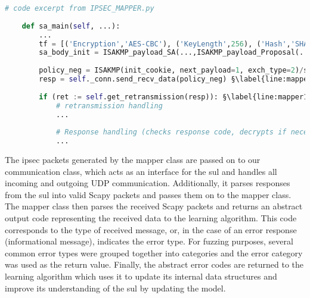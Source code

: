 \begin{lstlisting}[float=h, caption=Excerpt of mapper class sa\_main method code., label=lst:mapper1, language=python, escapechar=§]
	# code excerpt from IPSEC_MAPPER.py
	
	def sa_main(self, ...):
		...
		tf = [('Encryption','AES-CBC'), ('KeyLength',256), ('Hash','SHA'), ...]  §\label{line:mapper1_1}§
		sa_body_init = ISAKMP_payload_SA(...,ISAKMP_payload_Proposal(...,trans=ISAKMP_payload_Transform(..., transforms=tf))) §\label{line:mapper1_2}§
		
		policy_neg = ISAKMP(init_cookie, next_payload=1, exch_type=2)/sa_body_init §\label{line:mapper1_3}§
		resp = self._conn.send_recv_data(policy_neg) §\label{line:mapper1_4}§
		
		if (ret := self.get_retransmission(resp)): §\label{line:mapper1_5}§
			# retransmission handling
			...
			
			# Response handling (checks response code, decrypts if necessary, updates relevant local values)
			...
\end{lstlisting}

The \ac{ipsec} packets generated by the mapper class are passed on to our communication class, which acts as an interface for the \ac{sul} and handles all incoming and outgoing UDP communication. Additionally, it parses responses from the \ac{sul} into valid Scapy packets and passes them on to the mapper class. The mapper class then parses the received Scapy packets and returns an abstract output code representing the received data to the learning algorithm. This code corresponds to the type of received message, or, in the case of an error response (informational message), indicates the error type. For fuzzing purposes, several common error types were grouped together into categories and the error category was used as the return value. Finally, the abstract error codes are returned to the learning algorithm which uses it to update its internal data structures and improve its understanding of the \ac{sul} by updating the model. \\

